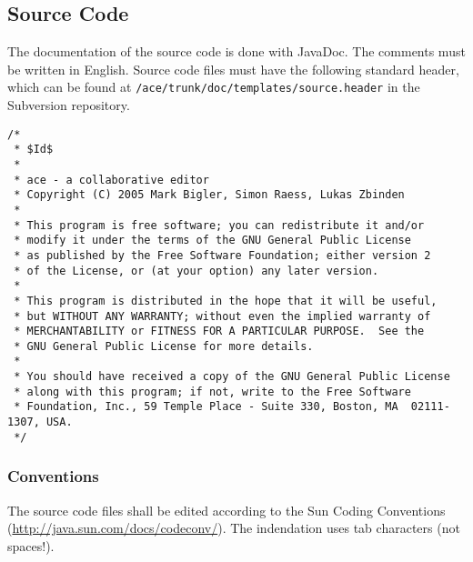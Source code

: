 \documentclass[11pt,a4paper]{article}
\begin{document}
\subsection{Source Code}
The documentation of the source code is done with JavaDoc. The comments must be written in English. Source code files must have the following standard header,
which can be found at \texttt{/ace/trunk/doc/templates/source.header} in the Subversion repository.

\small{
\begin{verbatim}
/*
 * $Id$
 *
 * ace - a collaborative editor
 * Copyright (C) 2005 Mark Bigler, Simon Raess, Lukas Zbinden
 *
 * This program is free software; you can redistribute it and/or
 * modify it under the terms of the GNU General Public License
 * as published by the Free Software Foundation; either version 2
 * of the License, or (at your option) any later version.
 *
 * This program is distributed in the hope that it will be useful,
 * but WITHOUT ANY WARRANTY; without even the implied warranty of
 * MERCHANTABILITY or FITNESS FOR A PARTICULAR PURPOSE.  See the
 * GNU General Public License for more details.
 *
 * You should have received a copy of the GNU General Public License
 * along with this program; if not, write to the Free Software
 * Foundation, Inc., 59 Temple Place - Suite 330, Boston, MA  02111-1307, USA.
 */
\end{verbatim}
}

\subsubsection*{Conventions}

The source code files shall be edited according to the Sun Coding Conventions (\href{http://java.sun.com/docs/codeconv/}{http://java.sun.com/docs/codeconv/}).
The indendation uses tab characters (not spaces!).
\end{document}
